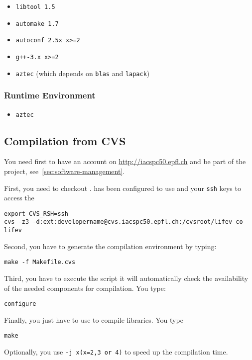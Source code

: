 \begin{itemize}
\item \verb!libtool 1.5!
\item \verb!automake 1.7!
\item \verb!autoconf 2.5x x>=2!
\item \verb!g++-3.x x>=2!
\item \verb!aztec! (which depends on \verb!blas! and \verb!lapack!)
\end{itemize} 

\subsubsection{Runtime Environment}
\label{sec:runtime-env} 

\begin{itemize}
\item \verb!aztec!
\end{itemize} 

\subsection{Compilation from CVS}
\label{sec:compile-cvs} 
You need first to have an account on \url{http://iacspc50.epfl.ch} and
be part of the \lifev project, see~\ref{sec:software-management}. 

\noindent First, you need to checkout \lifev.  has
been configured to use  and your \verb!ssh! keys to
access the 

\begin{verbatim}
export CVS_RSH=ssh
cvs -z3 -d:ext:developername@cvs.iacspc50.epfl.ch:/cvsroot/lifev co lifev
\end{verbatim}

\noindent Second, you have to generate the compilation environment by typing:
\begin{verbatim}
make -f Makefile.cvs
\end{verbatim}

\noindent Third, you have to execute the script
it will automatically check the availability of the needed components
for \lifev compilation. You type: 

\begin{verbatim}
configure
\end{verbatim}

\noindent Finally, you just have to use  to compile \lifev libraries. You type
\begin{verbatim}
make 
\end{verbatim}
Optionally, you use \verb!-j x(x=2,3 or 4)! to speed up the compilation time.

